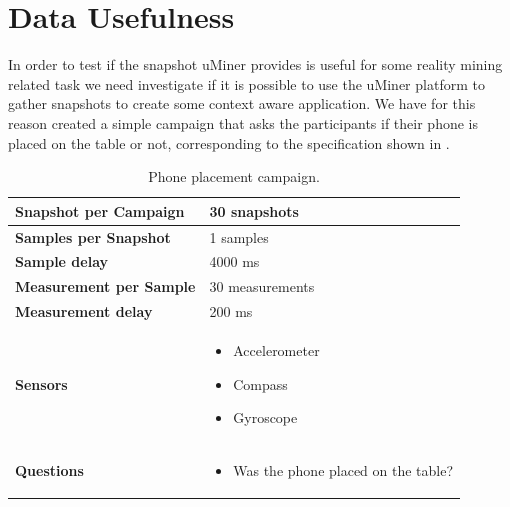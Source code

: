 
\section{Data Usefulness}
\label{sec:data_usefulness}

In order to test if the snapshot uMiner provides is useful for some reality mining related task we need investigate if it is possible to use the uMiner platform to gather snapshots to create some context aware application. We have for this reason created a simple campaign that asks the participants if their phone is placed on the table or not, corresponding to the specification shown in .

\begin{table}[!htbp]
    \centering
    \begin{tabular}{|m{}|m{}|} 
  \hline
  \textbf{Snapshot per Campaign}    & 30 snapshots      \\ \hline
  \textbf{Samples per Snapshot}     & 1 samples         \\ \hline
  \textbf{Sample delay}             & 4000 ms           \\ \hline
  \textbf{Measurement per Sample}   & 30 measurements   \\ \hline
  \textbf{Measurement delay}        & 200 ms            \\ \hline
  \textbf{Sensors}                  & \begin{itemize}[noitemsep]
                \item Accelerometer 
                \item Compass
                \item Gyroscope
              \end{itemize}                             \\ \hline
    \textbf{Questions}                & \begin{itemize}[noitemsep]
                                            \item Was the phone placed on the table?
                                        \end{itemize} \\ \hline
    \end{tabular}
    \caption{Phone placement campaign.}
    \label{tab:phone_placement_campaing}
\end{table}

